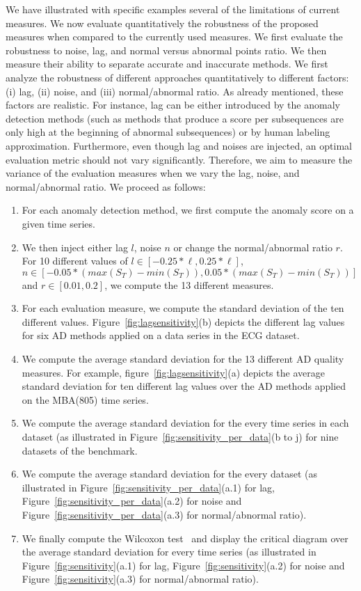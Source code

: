 We have illustrated with specific examples several of the limitations of current measures. 
We now evaluate quantitatively the robustness of the proposed measures when compared to the currently used measures. 
We first evaluate the robustness to noise, lag, and normal versus abnormal points ratio. We then measure their ability to separate accurate and inaccurate methods.
We first analyze the robustness of different approaches quantitatively to different factors: (i) lag, (ii) noise, and (iii) normal/abnormal ratio. As already mentioned, these factors are realistic. For instance, lag can be either introduced by the anomaly detection methods (such as methods that produce a score per subsequences are only high at the beginning of abnormal subsequences) or by human labeling approximation. Furthermore, even though lag and noises are injected, an optimal evaluation metric should not vary significantly. Therefore, we aim to measure the variance of the evaluation measures when we vary the lag, noise, and normal/abnormal ratio. We proceed as follows:

\begin{enumerate}[noitemsep,topsep=0pt,parsep=0pt,partopsep=0pt,leftmargin=0.5cm]
\item For each anomaly detection method, we first compute the anomaly score on a given time series.
\item We then inject either lag $l$, noise $n$ or change the normal/abnormal ratio $r$. For 10 different values of $l \in [-0.25*\ell,0.25*\ell]$, $n \in [-0.05*(max(S_T)-min(S_T)),0.05*(max(S_T)-min(S_T))]$ and $r \in [0.01,0.2]$, we compute the 13 different measures.
\item For each evaluation measure, we compute the standard deviation of the ten different values. Figure~\ref{fig:lagsensitivity}(b) depicts the different lag values for six AD methods applied on a data series in the ECG dataset.
\item We compute the average standard deviation for the 13 different AD quality measures. For example, figure~\ref{fig:lagsensitivity}(a) depicts the average standard deviation for ten different lag values over the AD methods applied on the MBA(805) time series.
\item We compute the average standard deviation for the every time series in each dataset (as illustrated in Figure~\ref{fig:sensitivity_per_data}(b to j) for nine datasets of the benchmark.
\item We compute the average standard deviation for the every dataset (as illustrated in Figure~\ref{fig:sensitivity_per_data}(a.1) for lag, Figure~\ref{fig:sensitivity_per_data}(a.2) for noise and Figure~\ref{fig:sensitivity_per_data}(a.3) for normal/abnormal ratio).
\item We finally compute the Wilcoxon test~\cite{10.2307/3001968} and display the critical diagram over the average standard deviation for every time series (as illustrated in Figure~\ref{fig:sensitivity}(a.1) for lag, Figure~\ref{fig:sensitivity}(a.2) for noise and Figure~\ref{fig:sensitivity}(a.3) for normal/abnormal ratio).
\end{enumerate}

